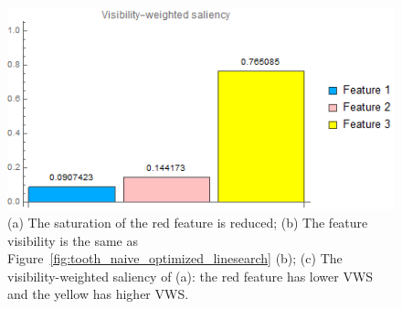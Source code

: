 \begin{figure}
\begin{minipage}{.24\textwidth}
		\subcaption{}
	\end{minipage}~
	\begin{minipage}{.24\textwidth}
		\includegraphics[width=1\linewidth]{images/tooth_naive_optimized_linesearch_red_low_saturation_visibility_saliency_weighted_chart}
		\subcaption{}
	\end{minipage}
	\caption[The saturation of the red feature is reduced.]{(a) The saturation of the red feature is reduced; (b) The feature visibility is the same as Figure~\ref{fig:tooth_naive_optimized_linesearch} (b); (c) The visibility-weighted saliency of (a): the red feature has lower VWS and the yellow has higher VWS.}
	\label{fig:tooth_naive_optimized_linesearch_low_saturation}
\end{figure}
%
